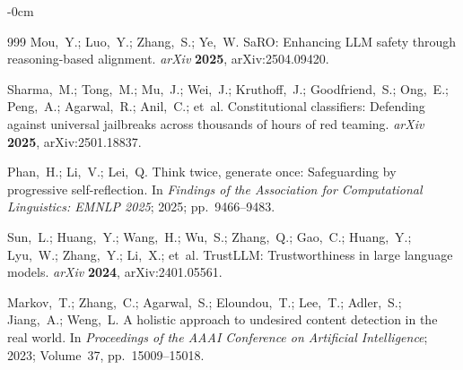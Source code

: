 \documentclass[superintelligence,article,submit,pdftex,moreauthors]{Definitions/mdpi}
\begin{document}
\begin{adjustwidth}{-\extralength}{0cm}
{\begin{thebibliography}{999}
Mou,~Y.; Luo,~Y.; Zhang,~S.; Ye,~W.
{SaRO}: Enhancing {LLM} safety through reasoning-based alignment.
{\em arXiv} {\bf 2025}, arXiv:2504.09420.

Sharma,~M.; Tong,~M.; Mu,~J.; Wei,~J.; Kruthoff,~J.; Goodfriend,~S.; Ong,~E.; Peng,~A.; Agarwal,~R.; Anil,~C.; et~al.
Constitutional classifiers: Defending against universal jailbreaks across thousands of hours of red teaming.
{\em arXiv} {\bf 2025}, arXiv:2501.18837.

Phan,~H.; Li,~V.; Lei,~Q.
Think twice, generate once: Safeguarding by progressive self-reflection.
In {\em Findings of the Association for Computational Linguistics: EMNLP 2025}; 2025; pp.~9466--9483.

Sun,~L.; Huang,~Y.; Wang,~H.; Wu,~S.; Zhang,~Q.; Gao,~C.; Huang,~Y.; Lyu,~W.; Zhang,~Y.; Li,~X.; et~al.
{TrustLLM}: Trustworthiness in large language models.
{\em arXiv} {\bf 2024}, arXiv:2401.05561.

Markov,~T.; Zhang,~C.; Agarwal,~S.; Eloundou,~T.; Lee,~T.; Adler,~S.; Jiang,~A.; Weng,~L.
A holistic approach to undesired content detection in the real world.
In {\em Proceedings of the AAAI Conference on Artificial Intelligence}; 2023; Volume~37, pp.~15009--15018.

\end{thebibliography}
}

\PublishersNote{}
\end{adjustwidth}
\end{document}

